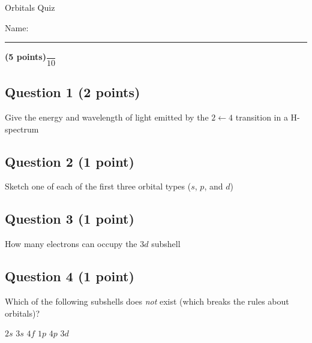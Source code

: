 \documentclass[12pt, letterpaper]{memoir}
\begin{document}
	\begin{center}
		{\large Orbitals Quiz}
	\end{center}
	{\large Name: \rule[-1mm]{4in}{.1pt} {\bfseries (5 points)}\hspace{4em}$\dfrac{~}{10}$} 
	
	\subsection*{Question 1 (2 points)}
	Give the energy and wavelength of light emitted by the $2\leftarrow4$ transition in a H-spectrum
	
	\vspace{10em}
	\subsection*{Question 2 (1 point)}
	Sketch one of each of the first three orbital types ($s$, $p$, and $d$)

	\vspace{10em}
	\subsection*{Question 3 (1 point)}
	How many electrons can occupy the $3d$ subshell
	
	\vspace{8em}
	\subsection*{Question 4 (1 point)}
	Which of the following subshells does \emph{not} exist (which breaks the rules about orbitals)?
	
	{\large $2s$ \hspace{3em} $3s$ \hspace{3em} $4f$ \hspace{3em} $1p$ \hspace{3em} $4p$ \hspace{3em} $3d$}
	
\end{document}
